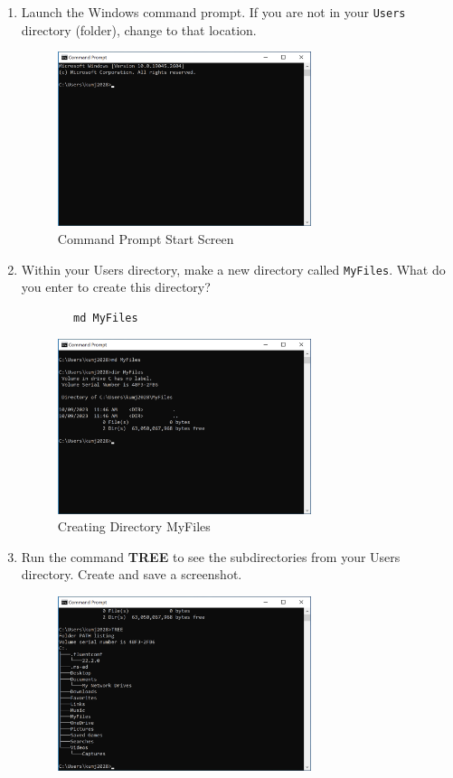 \documentclass[12pt]{article}
\newenvironment{problem}[2][Problem]{\begin{trivlist}
\item[\hskip \labelsep {\bfseries #1}\hskip \labelsep {\bfseries #2.}]}{\end{trivlist}}
\begin{document}
\begin{problem}{1}
\begin{enumerate}
    \item Launch the Windows command prompt. If you are not in your \verb|Users| directory (folder), change to that location.
    \begin{figure}[H]
        \centering
        \includegraphics[width=0.7\textwidth]{cmd}
        \caption{Command Prompt Start Screen}
    \end{figure}
    \pagebreak
    \item Within your Users directory, make a new directory called \verb|MyFiles|. What do you enter to create this directory?
    \begin{verbatim}
        md MyFiles
    \end{verbatim}
    \begin{figure}[H]
        \centering
        \includegraphics[width=0.7\textwidth]{md}
        \caption{Creating Directory MyFiles}
    \end{figure}
    \item Run the command \textbf{TREE} to see the subdirectories from your Users directory. Create and save a screenshot.
    \begin{figure}[H]
        \centering
        \includegraphics[width=0.7\textwidth]{tree}

\end{figure}
\end{enumerate}
\end{problem}
\end{document}
